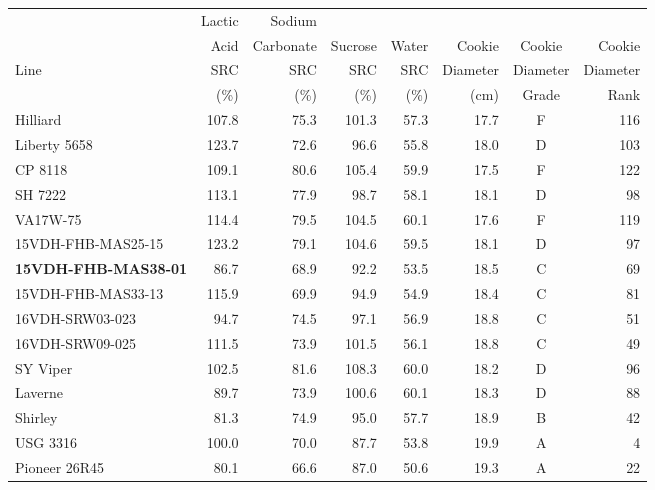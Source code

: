 \documentclass[12pt, letterpaper]{article}
\begin{document}
\begin{landscape}
\begin{table}[ht]
\begin{tabular}{lrrrrrcr}
  \hline
     & Lactic & Sodium    &         &       &          &          &  \\ 
     & Acid   & Carbonate & Sucrose & Water & Cookie   & Cookie   & Cookie \\ 
Line & SRC    & SRC       & SRC     & SRC   & Diameter & Diameter & Diameter \\ 
     & (\%)   & (\%)      & (\%)    & (\%)  & (cm)     & Grade    &  Rank \\ 
  \hline
  Hilliard           & 107.8 & 75.3 & 101.3 & 57.3 & 17.7 & F & 116 \\ 
  Liberty 5658       & 123.7 & 72.6 & 96.6  & 55.8 & 18.0 & D & 103 \\ 
  CP 8118            & 109.1 & 80.6 & 105.4 & 59.9 & 17.5 & F & 122 \\ 
  SH 7222            & 113.1 & 77.9 & 98.7  & 58.1 & 18.1 & D & 98 \\ 
  VA17W-75           & 114.4 & 79.5 & 104.5 & 60.1 & 17.6 & F & 119 \\ 
  15VDH-FHB-MAS25-15 & 123.2 & 79.1 & 104.6 & 59.5 & 18.1 & D & 97 \\ 
  \textbf{15VDH-FHB-MAS38-01} & 86.7  & 68.9 & 92.2  & 53.5 & 18.5 & C & 69 \\ 
  15VDH-FHB-MAS33-13 & 115.9 & 69.9 & 94.9  & 54.9 & 18.4 & C & 81 \\ 
  16VDH-SRW03-023    & 94.7  & 74.5 & 97.1  & 56.9 & 18.8 & C & 51 \\ 
  16VDH-SRW09-025    & 111.5 & 73.9 & 101.5 & 56.1 & 18.8 & C & 49 \\ 
  SY Viper           & 102.5 & 81.6 & 108.3 & 60.0 & 18.2 & D & 96 \\ 
  Laverne            & 89.7  & 73.9 & 100.6 & 60.1 & 18.3 & D & 88 \\ 
  Shirley            & 81.3  & 74.9 & 95.0  & 57.7 & 18.9 & B & 42 \\ 
  USG 3316           & 100.0 & 70.0 & 87.7  & 53.8 & 19.9 & A & 4 \\ 
  Pioneer 26R45      & 80.1  & 66.6 & 87.0  & 50.6 & 19.3 & A & 22 \\ 
   \hline
\end{tabular}
\end{table}


\end{landscape}
\end{document}
